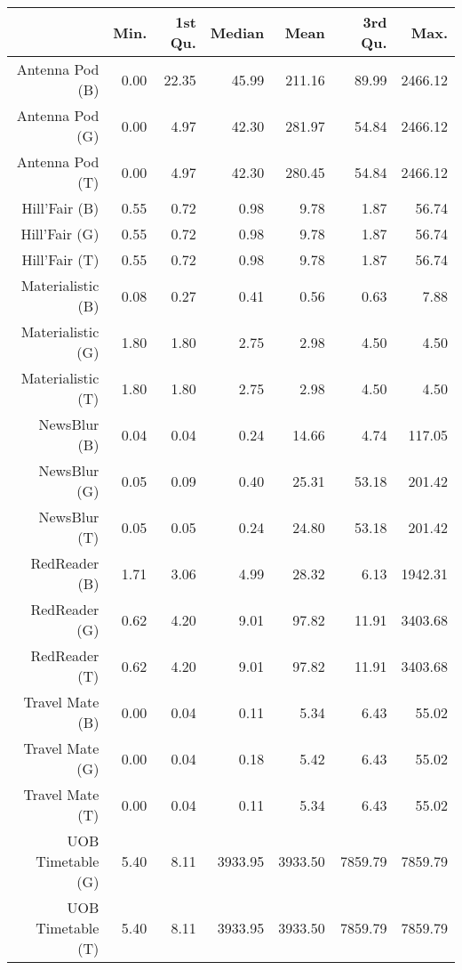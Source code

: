 \begin{table}[ht]
\centering
\begin{tabular}{rrrrrrr}
  \hline
 & Min. & 1st Qu. & Median & Mean & 3rd Qu. & Max. \\ 
  \hline
Antenna Pod (B) & 0.00 & 22.35 & 45.99 & 211.16 & 89.99 & 2466.12 \\ 
  Antenna Pod (G) & 0.00 & 4.97 & 42.30 & 281.97 & 54.84 & 2466.12 \\ 
  Antenna Pod (T) & 0.00 & 4.97 & 42.30 & 280.45 & 54.84 & 2466.12 \\ 
  Hill'Fair (B) & 0.55 & 0.72 & 0.98 & 9.78 & 1.87 & 56.74 \\ 
  Hill'Fair (G) & 0.55 & 0.72 & 0.98 & 9.78 & 1.87 & 56.74 \\ 
  Hill'Fair (T) & 0.55 & 0.72 & 0.98 & 9.78 & 1.87 & 56.74 \\ 
  Materialistic (B) & 0.08 & 0.27 & 0.41 & 0.56 & 0.63 & 7.88 \\ 
  Materialistic (G) & 1.80 & 1.80 & 2.75 & 2.98 & 4.50 & 4.50 \\ 
  Materialistic (T) & 1.80 & 1.80 & 2.75 & 2.98 & 4.50 & 4.50 \\ 
  NewsBlur (B) & 0.04 & 0.04 & 0.24 & 14.66 & 4.74 & 117.05 \\ 
  NewsBlur (G) & 0.05 & 0.09 & 0.40 & 25.31 & 53.18 & 201.42 \\ 
  NewsBlur (T) & 0.05 & 0.05 & 0.24 & 24.80 & 53.18 & 201.42 \\ 
  RedReader (B) & 1.71 & 3.06 & 4.99 & 28.32 & 6.13 & 1942.31 \\ 
  RedReader (G) & 0.62 & 4.20 & 9.01 & 97.82 & 11.91 & 3403.68 \\ 
  RedReader (T) & 0.62 & 4.20 & 9.01 & 97.82 & 11.91 & 3403.68 \\ 
  Travel Mate (B) & 0.00 & 0.04 & 0.11 & 5.34 & 6.43 & 55.02 \\ 
  Travel Mate (G) & 0.00 & 0.04 & 0.18 & 5.42 & 6.43 & 55.02 \\ 
  Travel Mate (T) & 0.00 & 0.04 & 0.11 & 5.34 & 6.43 & 55.02 \\ 
  UOB Timetable (G) & 5.40 & 8.11 & 3933.95 & 3933.50 & 7859.79 & 7859.79 \\ 
  UOB Timetable (T) & 5.40 & 8.11 & 3933.95 & 3933.50 & 7859.79 & 7859.79 \\ 
   \hline
\end{tabular}
\end{table}
